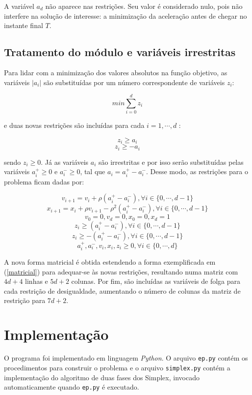 \documentclass[10pt,oneside,a4paper]{article}
\begin{document}
A variável $ a_d $ não aparece nas restrições. Seu valor é considerado nulo, pois não interfere na solução de interesse: a minimização da aceleração antes de chegar no instante final $T$.

\subsection{Tratamento do módulo e variáveis irrestritas}

Para lidar com a minimização dos valores absolutos na função objetivo, as variáveis $ |a_i| $ são substituídas por um número correspondente de variáveis $ z_i $: 

\[
min \sum_{i=0}^{d}z_i
\]

\noindent
e duas novas restrições são incluídas para cada $i = 1, \cdots, d$ :

\[
z_i \ge a_i
\] 
\[
z_i \ge -a_i
\] 

\noindent
sendo $z_i \ge 0$. Já as variáveis $a_i$ são irrestritas e por isso serão substituídas pelas variáveis $a_i^+ \ge 0$ e $a_i^- \ge 0$, tal que $a_i = a_i^+ - a_i^-$. Desse modo, as restrições para o problema ficam dadas por:

\[ v_{i+1} = v_i + \rho (a_i^+ - a_i^-), \forall i \in \{0, \dotsm, d-1\} \]
\[ x_{i+1} = x_i + \rho v_{i+1} - \rho^2 (a_i^+ - a_i^-), \forall i \in \{0, \dotsm, d-1\} \]
\[ v_0 = 0, v_d = 0, x_0 = 0, x_d = 1 \]
\[ z_i \ge (a_i^+ - a_i^-), \forall i \in \{0, \dotsm, d-1\} \]
\[ z_i \ge -(a_i^+ - a_i^-), \forall i \in \{0, \dotsm, d-1\} \]
\[ a_i^+, a_i^-, v_i, x_i, z_i \ge 0, \forall i \in \{0, \dotsm, d\} \]

A nova forma matricial é obtida estendendo a forma exemplificada em (\ref{matricial}) para adequar-se às novas restrições, resultando numa matriz com $ 4d+4 $ linhas e $ 5d+2 $ colunas. Por fim, são incluídas as variáveis de folga para cada restrição de desigualdade, aumentando o número de colunas da matriz de restrição para $ 7d+2 $.

\section{Implementação}

O programa foi implementado em linguagem \emph{Python}. O arquivo \texttt{ep.py} contém os procedimentos para construir o problema e o arquivo \texttt{simplex.py} contém a implementação do algoritmo de duas fases dos Simplex, invocado automaticamente quando \texttt{ep.py} é executado.
\end{document}
